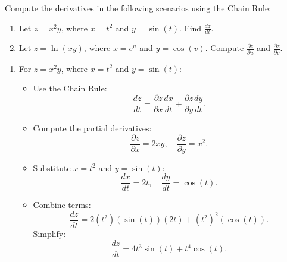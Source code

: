 \exampleline
\begin{example}
Compute the derivatives in the following scenarios using the Chain Rule:
\begin{enumerate}
    \item Let \( z = x^2y \), where \( x = t^2 \) and \( y = \sin(t) \). Find \( \frac{dz}{dt} \).
    \item Let \( z = \ln(xy) \), where \( x = e^u \) and \( y = \cos(v) \). Compute \( \frac{\partial z}{\partial u} \) and \( \frac{\partial z}{\partial v} \).
\end{enumerate}

\begin{solution}
\begin{enumerate}
    \item For \( z = x^2y \), where \( x = t^2 \) and \( y = \sin(t) \):
    \begin{itemize}
        \item Use the Chain Rule:
        \[
        \frac{dz}{dt} = \frac{\partial z}{\partial x} \frac{dx}{dt} + \frac{\partial z}{\partial y} \frac{dy}{dt}.
        \]
        \item Compute the partial derivatives:
        \[
        \frac{\partial z}{\partial x} = 2xy, \quad \frac{\partial z}{\partial y} = x^2.
        \]
        \item Substitute \( x = t^2 \) and \( y = \sin(t) \):
        \[
        \frac{dx}{dt} = 2t, \quad \frac{dy}{dt} = \cos(t).
        \]
        \item Combine terms:
        \[
        \frac{dz}{dt} = 2(t^2)(\sin(t))(2t) + (t^2)^2(\cos(t)).
        \]
        Simplify:
        \[
        \frac{dz}{dt} = 4t^3\sin(t) + t^4\cos(t).
        \]
    \end{itemize}


\end{enumerate}
\end{solution}
\end{example}
